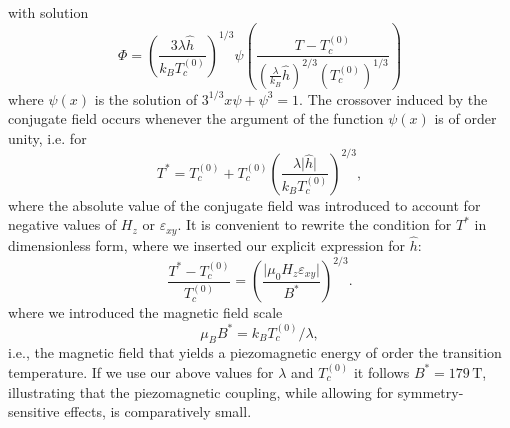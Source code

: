 \documentclass[
 reprint,










 amsmath,amssymb,
 aps,






]{revtex4-2}
\begin{document}
with solution
\begin{equation}
\Phi=\left(\frac{3\lambda \hat{h}}{k_BT_c^{(0)}}\right)^{1/3}\psi\left(\frac{T-T_c^{(0)}}{\left(\frac{\lambda}{k_B}\hat{h}\right)^{2/3}\left(T_c^{(0)}\right)^{1/3}}\right)
\end{equation}
where  $\psi(x)$ is the solution of  $3^{1/3}x \psi+\psi^3=1$.
The crossover induced by the conjugate field  occurs whenever the argument of the function $\psi(x)$ is of order unity, i.e. for
\begin{equation}
    T^*= T_c^{(0)}+T_c^{(0)}\left(\frac{\lambda \lvert \hat{h} \rvert}{k_B T_c^{(0)}}\right)^{2/3},
    \label{eq:Tstarinmeanfield}
\end{equation}
where the absolute value of the conjugate field was introduced to account for negative values of $H_z$ or $\varepsilon_{xy}$.
It is convenient to rewrite the condition for $T^*$ in dimensionless form, where we inserted our explicit expression for $\hat{h}$:
\begin{equation}
    \frac{T^*-T_c^{(0)}}{T_c^{(0)}}=\left(\frac{\lvert\mu_0H_z\varepsilon_{xy}\rvert}{B^*}\right)^{2/3}.
\end{equation}
where we introduced the magnetic field scale
\begin{equation}
  \mu_BB^*=k_BT_c^{(0)}/\lambda,
\end{equation}
i.e., the magnetic field that yields a piezomagnetic energy of order the transition temperature.
If we use our above values for $\lambda$ and $T_c^{(0)}$ it follows $B^*= 179\,\mathrm{T}$, illustrating that the piezomagnetic coupling, while allowing for symmetry-sensitive effects, is comparatively small.
\end{document}
